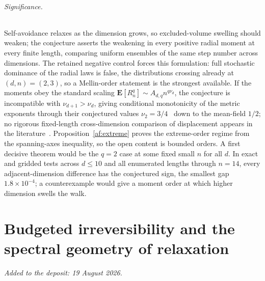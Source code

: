 \documentclass[11pt]{article}
\theoremstyle{definition}
\begin{document}
\paragraph{Significance.}
Self-avoidance relaxes as the dimension grows, so excluded-volume swelling should weaken; the conjecture asserts the weakening in every positive radial moment at every finite length, comparing uniform ensembles of the same step number across dimensions.  The retained negative control forces this formulation: full stochastic dominance of the radial laws is false, the distributions crossing already at $(d,n)=(2,3)$, so a Mellin-order statement is the strongest available.  If the moments obey the standard scaling $\mathbf E[R_n^q]\sim A_{d,q}n^{q\nu_d}$, the conjecture is incompatible with $\nu_{d+1}>\nu_d$, giving conditional monotonicity of the metric exponents through their conjectured values $\nu_2=3/4$~\cite{Nie82} down to the mean-field $1/2$; no rigorous fixed-length cross-dimension comparison of displacement appears in the literature~\cite{MS93,BDGS12}.  Proposition~\ref{af:extreme} proves the extreme-order regime from the spanning-axes inequality, so the open content is bounded orders.  A first decisive theorem would be the $q=2$ case at some fixed small $n$ for all $d$.  In exact and gridded tests across $d\le10$ and all enumerated lengths through $n=14$, every adjacent-dimension difference has the conjectured sign, the smallest gap $1.8\times10^{-4}$; a counterexample would give a moment order at which higher dimension swells the walk.

\part{Budgeted irreversibility and the spectral geometry of relaxation}

\medskip\noindent\emph{Added to the deposit: 19 August 2026.}\par\medskip
\end{document}
